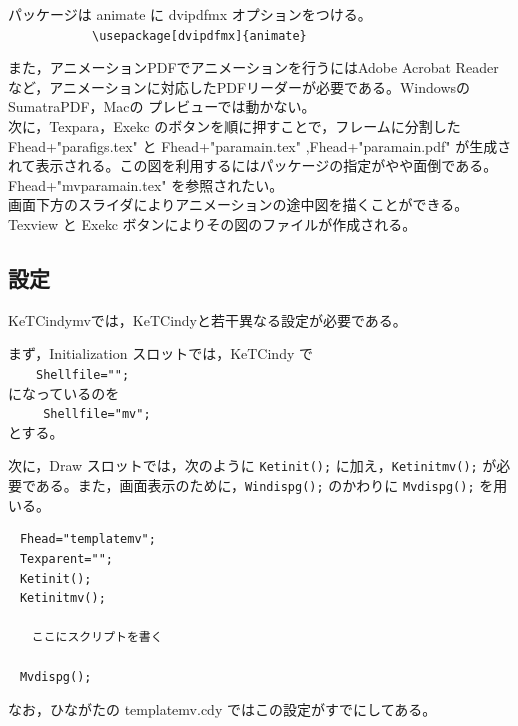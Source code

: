 \documentclass[papersize,a4paper,12pt,uplatex]{jsarticle}
\begin{document}
パッケージは animate に dvipdfmx オプションをつける。\\
　　　　　　\verb|\usepackage[dvipdfmx]{animate}|

また，アニメーションPDFでアニメーションを行うにはAdobe Acrobat Reader など，アニメーションに対応したPDFリーダーが必要である。WindowsのSumatraPDF，Macの プレビューでは動かない。\\

次に，Texpara，Exekc のボタンを順に押すことで，フレームに分割した Fhead+"parafigs.tex" と Fhead+"paramain.tex" ,Fhead+"paramain.pdf" が生成されて表示される。この図を利用するにはパッケージの指定がやや面倒である。 Fhead+"mvparamain.tex" を参照されたい。 \\

画面下方のスライダによりアニメーションの途中図を描くことができる。Texview と Exekc ボタンによりその図のファイルが作成される。


\subsection{設定}
KeTCindymvでは，KeTCindyと若干異なる設定が必要である。

まず，Initialization スロットでは，KeTCindy で\\
　　\verb|Shellfile="";|\\
になっているのを\\
　　\verb| Shellfile="mv";|\\
とする。

次に，Draw スロットでは，次のように \verb|Ketinit();| に加え，\verb|Ketinitmv();| が必要である。また，画面表示のために，\verb|Windispg();| のかわりに \verb|Mvdispg();| を用いる。
\begin{verbatim}
　Fhead="templatemv";
　Texparent="";
　Ketinit();
　Ketinitmv();

　　ここにスクリプトを書く

　Mvdispg();
\end{verbatim}
なお，ひながたの templatemv.cdy ではこの設定がすでにしてある。

\newpage
\end{document}
